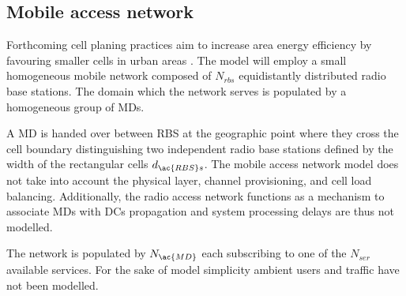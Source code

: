 \subsection{Mobile access network}
Forthcoming cell planing practices aim to increase area energy efficiency by favouring smaller cells in urban areas \cite{shahab2013framework,5360741}. The model will employ a small homogeneous mobile network composed of $N_{rbs}$ equidistantly distributed radio base stations. The domain which the network serves is populated by a homogeneous group of \ac{MD}s. 

A \ac{MD} is handed over between \ac{RBS} at the geographic point where they cross the cell boundary distinguishing two independent radio base stations defined by the width of the rectangular cells $d_{\ac{RBS}s}$. The mobile access network model does not take into account the physical layer, channel provisioning, and cell load balancing. Additionally, the radio access network functions as a mechanism to associate \ac{MD}s with \ac{DC}s propagation and system processing delays are thus not modelled.

The network is populated by $N_{\ac{MD}}$ each subscribing to one of the $N_{ser}$ available services. For the sake of model simplicity ambient users and traffic have not been modelled.